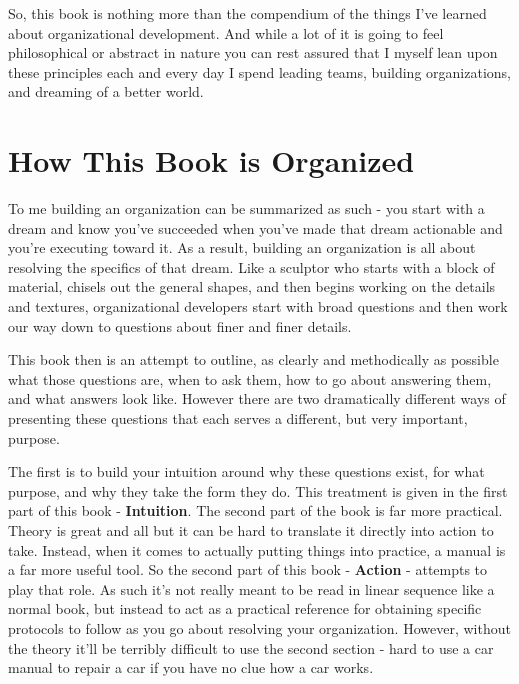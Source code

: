 \documentclass[11pt,a5paper]{book}
\begin{document}
So, this book is nothing more than the compendium of the things I've learned about organizational development. And while a lot of it is going to feel philosophical or abstract in nature you can rest assured that I myself lean upon these principles each and every day I spend leading teams, building organizations, and dreaming of a better world. 

\chapter{How This Book is Organized}
To me building an organization can be summarized as such - you start with a dream and know you've succeeded when you've made that dream actionable and you're executing toward it. As a result, building an organization is all about resolving the specifics of that dream. Like a sculptor who starts with a block of material, chisels out the general shapes, and then begins working on the details and textures, organizational developers start with broad questions and then work our way down to questions about finer and finer details. 
\newline

This book then is an attempt to outline, as clearly and methodically as possible what those questions are, when to ask them, how to go about answering them, and what answers look like. However there are two dramatically different ways of presenting these questions that each serves a different, but very important, purpose.
\newline

The first is to build your intuition around why these questions exist, for what purpose, and why they take the form they do. This treatment is given in the first part of this book - \textbf{Intuition}. The second part of the book is far more practical. Theory is great and all but it can be hard to translate it directly into action to take. Instead, when it comes to actually putting things into practice, a manual is a far more useful tool. So the second part of this book - \textbf{Action} - attempts to play that role. As such it's not really meant to be read in linear sequence like a normal book, but instead to act as a practical reference for obtaining specific protocols to follow as you go about resolving your organization. However, without the theory it'll be terribly difficult to use the second section - hard to use a car manual to repair a car if you have no clue how a car works. 
\newline
\end{document}
